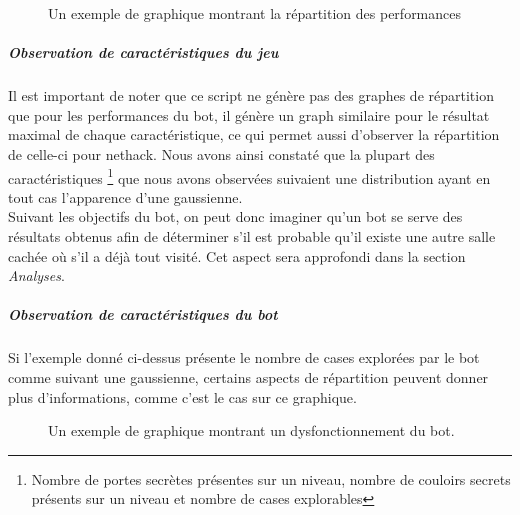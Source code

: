 \documentclass[a4paper,12pt]{article}
\begin{document}
\begin{figure}[H]
	\caption{\label{fig:impulse_graph} Un exemple de graphique montrant la
    répartition des performances}
\end{figure}

\subparagraph{Observation de caractéristiques du jeu}
Il est important de noter que ce script ne génère pas des graphes de répartition
que pour les performances du bot, il génère un graph similaire pour le résultat
maximal de chaque caractéristique, ce qui permet aussi d'observer la répartition
de celle-ci pour nethack. Nous avons ainsi constaté que la plupart des
caractéristiques \footnote{Nombre de portes secrètes présentes sur un niveau,
nombre de couloirs secrets présents sur un niveau et nombre de cases
explorables} que nous avons observées suivaient une distribution ayant en tout
cas l'apparence d'une gaussienne.
\\
Suivant les objectifs du bot, on peut donc imaginer qu'un bot se serve des
résultats obtenus afin de déterminer s'il est probable qu'il existe une autre
salle cachée où s'il a déjà tout visité. Cet aspect sera approfondi dans la
section {\em Analyses}.

\subparagraph{Observation de caractéristiques du bot}
Si l'exemple donné ci-dessus présente le nombre de cases explorées par le bot
comme suivant une gaussienne, certains aspects de répartition peuvent donner
plus d'informations, comme c'est le cas sur ce graphique.

\begin{figure}[H]
  \caption{\label{fig:nb_squares_explored} Un exemple de graphique montrant un
  dysfonctionnement du bot.}
\end{figure}
\end{document}
